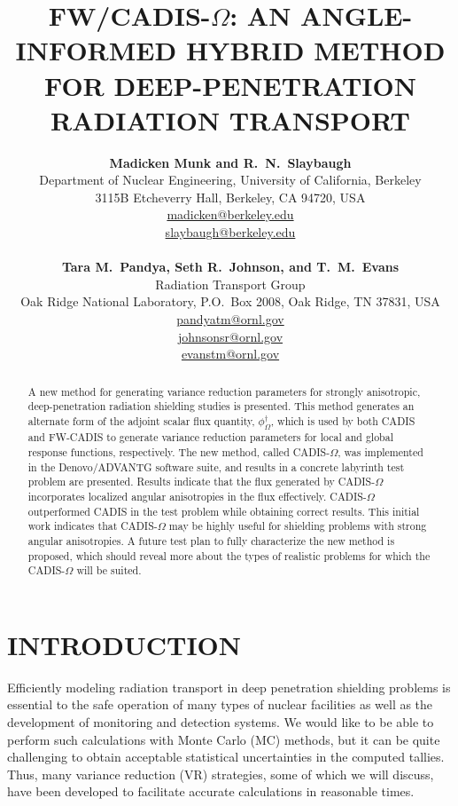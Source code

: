 \documentclass[12pt]{article}
\title{FW/CADIS-$\Omega$: AN ANGLE-INFORMED HYBRID METHOD FOR DEEP-PENETRATION RADIATION TRANSPORT}
\author{ 
  \textbf{Madicken Munk and R.~N.~Slaybaugh} \\
  Department of Nuclear Engineering, University of California, Berkeley \\
  3115B Etcheverry Hall, Berkeley, CA 94720, USA\\
  \href{mailto:madicken@berkeley.edu}{madicken@berkeley.edu}\\
  \href{mailto:slaybaugh@berkeley.edu}{slaybaugh@berkeley.edu}\\
  \\
  \textbf{Tara M.~Pandya, Seth R.~Johnson, and T.~M.~Evans}\\
  Radiation Transport Group\\
  Oak Ridge National Laboratory, P.O.\ Box 2008, Oak Ridge, TN 37831, USA\\
  \href{mailto:pandyatm@ornl.gov}{pandyatm@ornl.gov}\\
  \href{mailto:johnsonsr@ornl.gov}{johnsonsr@ornl.gov}\\
  \href{mailto:evanstm@ornl.gov}{evanstm@ornl.gov}
  }
\begin{document}


\maketitle

\begin{abstract}
A new method for generating variance reduction parameters for strongly anisotropic, deep-penetration radiation shielding studies is presented. This method generates an alternate form of the adjoint scalar flux quantity, $\phi^{\dagger}_{\Omega}$, which is used by both CADIS and FW-CADIS to generate variance reduction parameters for local and global response functions, respectively. The new method, called CADIS-$\Omega$, was implemented in the Denovo/ADVANTG software suite, and results in a concrete labyrinth test problem are presented. Results indicate that the flux generated by CADIS-$\Omega$ incorporates localized angular anisotropies in the flux effectively. CADIS-$\Omega$ outperformed CADIS in the test problem while obtaining correct results. This initial work indicates that CADIS-$\Omega$ may be highly useful for shielding problems with strong angular anisotropies. A future test plan to fully characterize the new method is proposed, which should reveal more about the types of realistic problems for which the CADIS-$\Omega$ will be suited. 
\end{abstract}


%
\section{INTRODUCTION}
\label{sect::intro}

Efficiently modeling radiation transport in deep penetration shielding problems is essential to the safe operation of many types of nuclear facilities as well as the development of monitoring and detection systems. We would like to be able to perform such calculations with Monte Carlo (MC) methods, but it can be quite challenging to obtain acceptable statistical uncertainties in the computed tallies. Thus, many variance reduction (VR) strategies, some of which we will discuss, have been developed to facilitate accurate calculations in reasonable times. 
\end{document}
